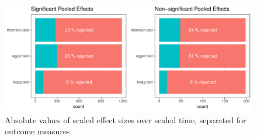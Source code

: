 \documentclass[11pt,a4paper,twoside]{book}\usepackage[]{graphicx}\usepackage[]{color}
\makeatletter
\newenvironment{kframe}{%
 \def\at@end@of@kframe{}%
 \ifinner\ifhmode%
  \def\at@end@of@kframe{\end{minipage}}%
  \begin{minipage}{\columnwidth}%
 \fi\fi%
 \def\FrameCommand##1{\hskip\@totalleftmargin \hskip-\fboxsep
 \colorbox{shadecolor}{##1}\hskip-\fboxsep
     \hskip-\linewidth \hskip-\@totalleftmargin \hskip\columnwidth}%
 \MakeFramed {\advance\hsize-\width
   \@totalleftmargin\z@ \linewidth\hsize
   \@setminipage}}%
 {\par\unskip\endMakeFramed%
 \at@end@of@kframe}
\newenvironment{knitrout}{}{} %
\makeatother
\begin{document}
\begin{figure}
\begin{knitrout}
\color{fgcolor}\begin{kframe}


{\ttfamily\noindent\color{warningcolor}{\#\# Warning: Removed 9701 rows containing non-finite values (stat\_smooth).}}

{\ttfamily\noindent\color{warningcolor}{\#\# Warning: Removed 9701 rows containing missing values (geom\_point).}}\end{kframe}

{\centering \includegraphics[width=\textwidth-3cm]{figure/ch02_figunnamed-chunk-24-1} 

}



\end{knitrout}
\caption{Absolute values of scaled effect sizes over scaled time, separated for outcome measures.}
\label{effects.overtime.separated}
\end{figure}


% 
% 
\end{document}
